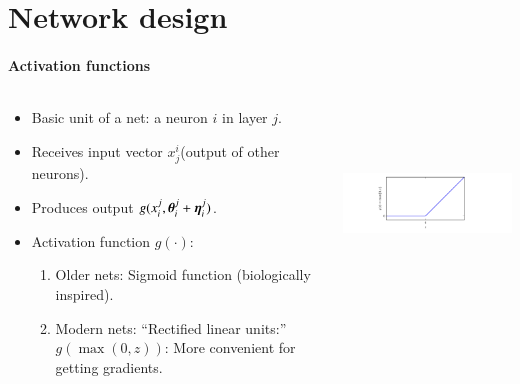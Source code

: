 \documentclass[notes, ignorenonframetext, compress, 10pt, xcolor=svgnames, aspectratio=169]{beamer}
\begin{document}
\section{Network design}
\frame{\sectionpage}
\begin{frame}[allowframebreaks]{\insertsection}
  \framesubtitle{Activation functions}
    \begin{columns}[T] %
      \begin{column}{.5\textwidth}
        \begin{itemize}
        \item Basic unit of a net: a neuron $i$ in layer $j$.
        \item Receives input vector $x_j^i$(output of other neurons).
        \item Produces output $g(x^j_i, {\boldsymbol \theta}^j_i + {\boldsymbol \eta}_i^j)$.
        \item Activation function $g(\cdot)$:
         \begin{enumerate}[$\cdot$]
          \item Older nets: Sigmoid function
          (biologically inspired).
          \item Modern nets: “Rectified linear
          units:” $g\left(\max(0, z)\right)$: 
          More convenient for getting
          gradients.
          \end{enumerate}
        \end{itemize}
      \end{column}%
    \hfill%
    \begin{column}{.5\textwidth}
      \includegraphics[width=9cm,height=5cm]{../../Ressources/Figs/Fig_DPbook_Goodfellow_et_al_activationFunction_chapt6.png}
    \end{column}
  \end{columns}
\end{frame}
\end{document}

